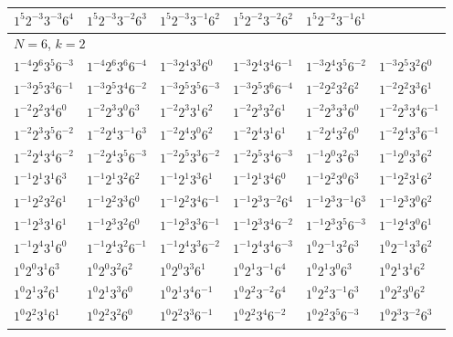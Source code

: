 \documentclass[12pt]{amsart}
\numberwithin{equation}{section}
\theoremstyle{plain}
\theoremstyle{definition}
\theoremstyle{remark}
\begin{document}
\begin{longtable}{llllll}
$1^{5}2^{-3}3^{-3}6^{4}$ & $1^{5}2^{-3}3^{-2}6^{3}$ & $1^{5}2^{-3}3^{-1}6^{2}$ & $1^{5}2^{-2}3^{-2}6^{2}$ & $1^{5}2^{-2}3^{-1}6^{1}$ & \\
\midrule
\multicolumn{6}{l}{$N=6$, $k=2$}\\
$1^{-4}2^{6}3^{5}6^{-3}$ & $1^{-4}2^{6}3^{6}6^{-4}$ & $1^{-3}2^{4}3^{3}6^{0}$ & $1^{-3}2^{4}3^{4}6^{-1}$ & $1^{-3}2^{4}3^{5}6^{-2}$ & $1^{-3}2^{5}3^{2}6^{0}$\\
$1^{-3}2^{5}3^{3}6^{-1}$ & $1^{-3}2^{5}3^{4}6^{-2}$ & $1^{-3}2^{5}3^{5}6^{-3}$ & $1^{-3}2^{5}3^{6}6^{-4}$ & $1^{-2}2^{2}3^{2}6^{2}$ & $1^{-2}2^{2}3^{3}6^{1}$\\
$1^{-2}2^{2}3^{4}6^{0}$ & $1^{-2}2^{3}3^{0}6^{3}$ & $1^{-2}2^{3}3^{1}6^{2}$ & $1^{-2}2^{3}3^{2}6^{1}$ & $1^{-2}2^{3}3^{3}6^{0}$ & $1^{-2}2^{3}3^{4}6^{-1}$\\
$1^{-2}2^{3}3^{5}6^{-2}$ & $1^{-2}2^{4}3^{-1}6^{3}$ & $1^{-2}2^{4}3^{0}6^{2}$ & $1^{-2}2^{4}3^{1}6^{1}$ & $1^{-2}2^{4}3^{2}6^{0}$ & $1^{-2}2^{4}3^{3}6^{-1}$\\
$1^{-2}2^{4}3^{4}6^{-2}$ & $1^{-2}2^{4}3^{5}6^{-3}$ & $1^{-2}2^{5}3^{3}6^{-2}$ & $1^{-2}2^{5}3^{4}6^{-3}$ & $1^{-1}2^{0}3^{2}6^{3}$ & $1^{-1}2^{0}3^{3}6^{2}$\\
$1^{-1}2^{1}3^{1}6^{3}$ & $1^{-1}2^{1}3^{2}6^{2}$ & $1^{-1}2^{1}3^{3}6^{1}$ & $1^{-1}2^{1}3^{4}6^{0}$ & $1^{-1}2^{2}3^{0}6^{3}$ & $1^{-1}2^{2}3^{1}6^{2}$\\
$1^{-1}2^{2}3^{2}6^{1}$ & $1^{-1}2^{2}3^{3}6^{0}$ & $1^{-1}2^{2}3^{4}6^{-1}$ & $1^{-1}2^{3}3^{-2}6^{4}$ & $1^{-1}2^{3}3^{-1}6^{3}$ & $1^{-1}2^{3}3^{0}6^{2}$\\
$1^{-1}2^{3}3^{1}6^{1}$ & $1^{-1}2^{3}3^{2}6^{0}$ & $1^{-1}2^{3}3^{3}6^{-1}$ & $1^{-1}2^{3}3^{4}6^{-2}$ & $1^{-1}2^{3}3^{5}6^{-3}$ & $1^{-1}2^{4}3^{0}6^{1}$\\
$1^{-1}2^{4}3^{1}6^{0}$ & $1^{-1}2^{4}3^{2}6^{-1}$ & $1^{-1}2^{4}3^{3}6^{-2}$ & $1^{-1}2^{4}3^{4}6^{-3}$ & $1^{0}2^{-1}3^{2}6^{3}$ & $1^{0}2^{-1}3^{3}6^{2}$\\
$1^{0}2^{0}3^{1}6^{3}$ & $1^{0}2^{0}3^{2}6^{2}$ & $1^{0}2^{0}3^{3}6^{1}$ & $1^{0}2^{1}3^{-1}6^{4}$ & $1^{0}2^{1}3^{0}6^{3}$ & $1^{0}2^{1}3^{1}6^{2}$\\
$1^{0}2^{1}3^{2}6^{1}$ & $1^{0}2^{1}3^{3}6^{0}$ & $1^{0}2^{1}3^{4}6^{-1}$ & $1^{0}2^{2}3^{-2}6^{4}$ & $1^{0}2^{2}3^{-1}6^{3}$ & $1^{0}2^{2}3^{0}6^{2}$\\
$1^{0}2^{2}3^{1}6^{1}$ & $1^{0}2^{2}3^{2}6^{0}$ & $1^{0}2^{2}3^{3}6^{-1}$ & $1^{0}2^{2}3^{4}6^{-2}$ & $1^{0}2^{2}3^{5}6^{-3}$ & $1^{0}2^{3}3^{-2}6^{3}$\\

\end{longtable}
\end{document}
